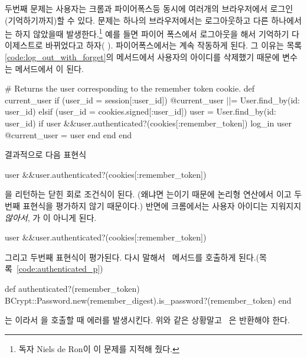 {{두번째 문제는 사용자는 크롬과 파이어폭스등 동시에 여러개의 브라우저에서 로그인(기억하기까지)할 수 있다. 문제는 하나의 브라우저에서는 로그아웃하고 다른 하나에서는 하지 않았을때 발생한다.\footnote{독자 Niels de Ron이 이 문제를 지적해 줬다.} 예를 들면 파이어 폭스에서 로그아웃을 해서 기억하기 다이제스트로 바뀌었다고 하자( ). 파이어폭스에서는 계속 작동하게 된다. 그 이유는 목록 \ref{code:log_out_with_forget}의  메서드에서 사용자의 아이디를 삭제했기 때문에  변수는  메서드에서 이 된다. 

\begin{code} # Returns the user corresponding to the remember token cookie. def current_user if (user_id = session[:user_id]) @current_user ||= User.find_by(id: user_id) elsif (user_id = cookies.signed[:user_id]) user = User.find_by(id: user_id) if user &&user.authenticated?(cookies[:remember_token]) log_in user @current_user = user end end end \end{code} 

\noindent 결과적으로 다음 표현식 

\begin{code} user &&user.authenticated?(cookies[:remember_token]) \end{code} 

\noindent {}을 리턴하는 닫힌 회로 조건식이 된다. (왜냐면   는이기 때문에 논리형 연산에서 이고 두번째 표현식을 평가하지 않기 때문이다.) 반면에 크롬에서는 사용자 아이디는 지워지지 \emph{않아서},  가 이 아니게 된다. 

\begin{code} user &&user.authenticated?(cookies[:remember_token]) \end{code} 

\noindent 그리고 두번째 표현식이 평가된다. 다시 말해서 \ 메서드를 호출하게 된다.(목록~\ref{code:authenticated_p}) 

\begin{code} def authenticated?(remember_token) BCrypt::Password.new(remember_digest).is_password?(remember_token) end \end{code} 

\noindent {} 는  이라서 을 호출할 때 에러를 발생시킨다. 위와 같은 상황말고 \ 은  반환해야 한다. 

}}
